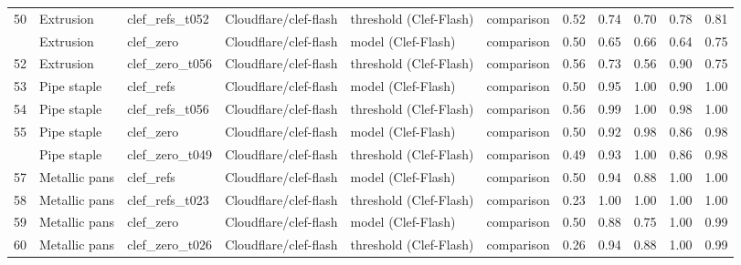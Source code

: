 \begin{table}
\begin{tabular}[t]{rlllllrrrrr}
50 & Extrusion & clef\_refs\_t052 & Cloudflare/clef-flash & threshold (Clef-Flash) & comparison & 0.52 & 0.74 & 0.70 & 0.78 & 0.81\\
\addlinespace
51 & Extrusion & clef\_zero & Cloudflare/clef-flash & model (Clef-Flash) & comparison & 0.50 & 0.65 & 0.66 & 0.64 & 0.75\\
52 & Extrusion & clef\_zero\_t056 & Cloudflare/clef-flash & threshold (Clef-Flash) & comparison & 0.56 & 0.73 & 0.56 & 0.90 & 0.75\\
53 & Pipe staple & clef\_refs & Cloudflare/clef-flash & model (Clef-Flash) & comparison & 0.50 & 0.95 & 1.00 & 0.90 & 1.00\\
54 & Pipe staple & clef\_refs\_t056 & Cloudflare/clef-flash & threshold (Clef-Flash) & comparison & 0.56 & 0.99 & 1.00 & 0.98 & 1.00\\
55 & Pipe staple & clef\_zero & Cloudflare/clef-flash & model (Clef-Flash) & comparison & 0.50 & 0.92 & 0.98 & 0.86 & 0.98\\
\addlinespace
56 & Pipe staple & clef\_zero\_t049 & Cloudflare/clef-flash & threshold (Clef-Flash) & comparison & 0.49 & 0.93 & 1.00 & 0.86 & 0.98\\
57 & Metallic pans & clef\_refs & Cloudflare/clef-flash & model (Clef-Flash) & comparison & 0.50 & 0.94 & 0.88 & 1.00 & 1.00\\
58 & Metallic pans & clef\_refs\_t023 & Cloudflare/clef-flash & threshold (Clef-Flash) & comparison & 0.23 & 1.00 & 1.00 & 1.00 & 1.00\\
59 & Metallic pans & clef\_zero & Cloudflare/clef-flash & model (Clef-Flash) & comparison & 0.50 & 0.88 & 0.75 & 1.00 & 0.99\\
60 & Metallic pans & clef\_zero\_t026 & Cloudflare/clef-flash & threshold (Clef-Flash) & comparison & 0.26 & 0.94 & 0.88 & 1.00 & 0.99\\
\bottomrule
\end{tabular}
\end{table}
